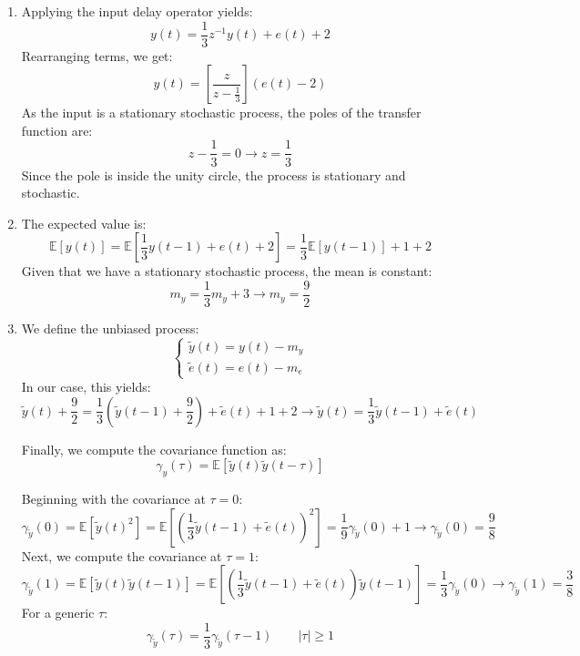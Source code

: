 \begin{enumerate}
    \item Applying the input delay operator yields:
        \[y(t)=\dfrac{1}{3}z^{-1}y(t)+e(t)+2\]
        Rearranging terms, we get:
        \[y(t)=\left[\dfrac{z}{z-\frac{1}{3}}\right]\left(e(t)-2\right)\]
        As the input is a stationary stochastic process, the poles of the transfer function are:
        \[z-\frac{1}{3}=0\rightarrow z=\frac{1}{3}\]
        Since the pole is inside the unity circle, the process is stationary and stochastic.
    \item The expected value is: 
        \[\mathbb{E}\left[y(t)\right]=\mathbb{E}\left[\dfrac{1}{3}y(t-1)+e(t)+2\right]=\dfrac{1}{3}\mathbb{E}\left[y(t-1)\right]+1+2\]
        Given that we have a stationary stochastic process, the mean is constant:
        \[m_y=\dfrac{1}{3}m_y+3\rightarrow m_y=\dfrac{9}{2}\]
    \item We define the unbiased process:
        \[\begin{cases}
            \tilde{y}(t)=y(t)-m_y \\
            \tilde{e}(t)=e(t)-m_e
        \end{cases}\]
        In our case, this yields:
        \[\tilde{y}(t)+\dfrac{9}{2}=\dfrac{1}{3}\left(\tilde{y}(t-1)+\dfrac{9}{2}\right)+\tilde{e}(t)+1+2\rightarrow\tilde{y}(t)=\dfrac{1}{3}\tilde{y}(t-1)+\tilde{e}(t)\]

        Finally, we compute the covariance function as: 
        \[\gamma_y(\tau)=\mathbb{E}\left[\tilde{y}(t)\tilde{y}(t-\tau)\right]\]
        
        Beginning with the covariance at $\tau=0$: 
        \[\gamma_{\tilde{y}}(0)=\mathbb{E}\left[\tilde{y}(t)^2\right]=\mathbb{E}\left[ \left(\dfrac{1}{3}\tilde{y}(t-1)+\tilde{e}(t)\right)^2\right]=\dfrac{1}{9}\gamma_{\tilde{y}}(0) + 1\rightarrow \gamma_{\tilde{y}}(0)=\dfrac{9}{8}\]
        Next, we compute the covariance at $\tau=1$: 
        \[\gamma_{\tilde{y}}(1)=\mathbb{E}\left[ \tilde{y}(t)\tilde{y}(t-1)\right]=\mathbb{E}\left[ \left(\dfrac{1}{3}\tilde{y}(t-1)+\tilde{e}(t)\right)\tilde{y}(t-1)\right]=\dfrac{1}{3}\gamma_{\tilde{y}}(0)\rightarrow \gamma_{\tilde{y}}(1)=\dfrac{3}{8}\]
        For a generic $\tau$: 
        \[\gamma_{\tilde{y}}(\tau)=\dfrac{1}{3}\gamma_{\tilde{y}}(\tau-1) \qquad \left\lvert \tau \right\rvert \geq 1\]
\end{enumerate}